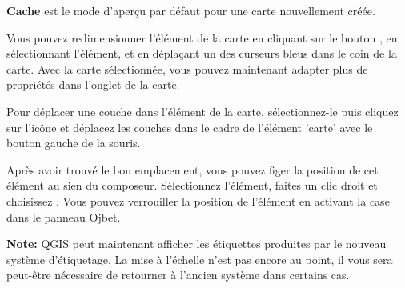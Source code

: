 \textbf{Cache} est le mode d'aperçu par défaut pour une carte nouvellement créée.

Vous pouvez redimensionner l'élément de la carte en cliquant sur le bouton , en sélectionnant l'élément, et en déplaçant un des curseurs bleus dans le coin de la carte. Avec la carte sélectionnée, vous pouvez maintenant adapter plus de propriétés dans l'onglet  de la carte. 

Pour déplacer une couche dans l'élément de la carte, sélectionnez-le puis cliquez sur l'icône  et déplacez les couches dans le cadre de l'élément 'carte' avec le bouton gauche de la souris.

Après avoir trouvé le bon emplacement, vous pouvez figer la position de cet élément au sien du composeur. Sélectionnez l'élément, faites un clic droit et choisissez . Vous pouvez verrouiller la position de l'élément en activant la case  dans le panneau Ojbet.

\textbf{Note:} QGIS \CURRENT peut maintenant afficher les étiquettes produites par le nouveau système d'étiquetage. La mise à l'échelle n'est pas encore au point, il vous sera peut-être nécessaire de retourner à l'ancien système dans certains cas.

